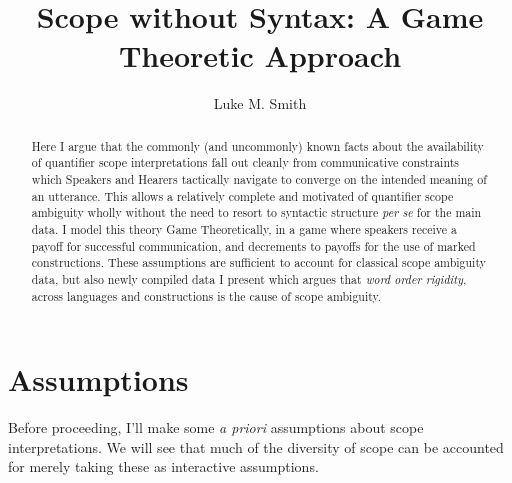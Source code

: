 \documentclass{article}
\title{Scope without Syntax: A Game Theoretic Approach}
\author{Luke M. Smith}
\begin{document}
\maketitle

\begin{abstract}
	Here I argue that the commonly (and uncommonly) known facts about the availability of quantifier scope interpretations fall out cleanly from communicative constraints which Speakers and Hearers tactically navigate to converge on the intended meaning of an utterance.
	This allows a relatively complete and motivated of quantifier scope ambiguity wholly without the need to resort to syntactic structure \textit{per se} for the main data.
	I model this theory Game Theoretically, in a game where speakers receive a payoff for successful communication, and decrements to payoffs for the use of marked constructions.
	These assumptions are sufficient to account for classical scope ambiguity data, but also newly compiled data I present which argues that \emph{word order rigidity}, across languages and constructions is the cause of scope ambiguity.
\end{abstract}




\section{Assumptions}


Before proceeding, I'll make some \emph{a priori} assumptions about scope interpretations.
We will see that much of the diversity of scope can be accounted for merely taking these as interactive assumptions.
\end{document}
